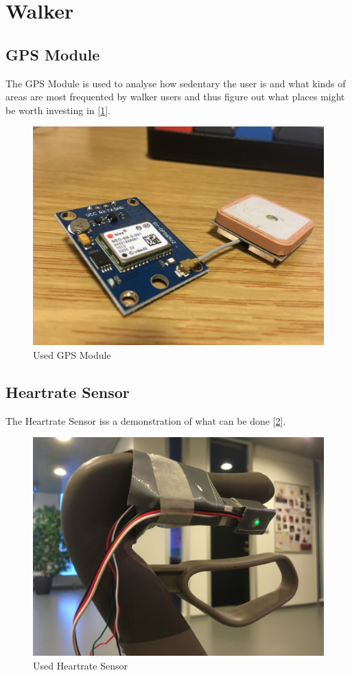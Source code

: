 \section{Walker}

\subsection{GPS Module}
The GPS Module is used to analyse how sedentary the user is and what kinds of areas are most frequented by walker users and thus figure out what places might be worth investing in [\ref{fig:walkerpictures_gps}].
\begin{figure}[h!]
	\centering
	\includegraphics[width=0.7\linewidth]{gfx/walkerpictures/gps}
	\caption{Used GPS Module}
	\label{fig:walkerpictures_gps}
\end{figure}

\subsection{Heartrate Sensor}
The Heartrate Sensor iss a demonstration of what can be done [\ref{fig:walkerpictures_heartrate}].
\begin{figure}[h!]
	\centering
	\includegraphics[width=0.7\linewidth]{gfx/walkerpictures/heartrate}
	\caption{Used Heartrate Sensor}
	\label{fig:walkerpictures_heartrate}
\end{figure}

